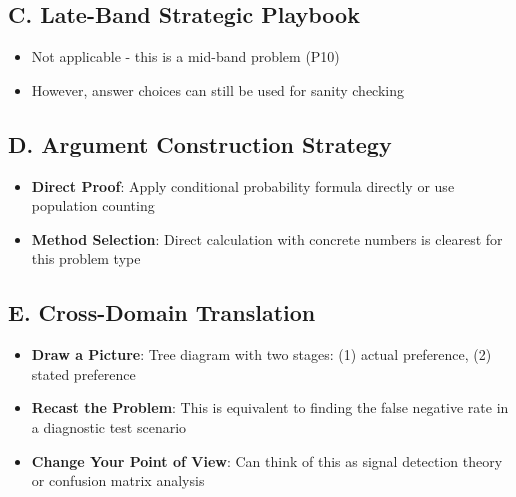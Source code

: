 \documentclass[]{article}
\begin{document}
\begin{strategicbox}
\subsection*{C. Late-Band Strategic Playbook}
\begin{itemize}[leftmargin=*]
    \item Not applicable - this is a mid-band problem (P10)
    \item However, answer choices can still be used for sanity checking
\end{itemize}

\subsection*{D. Argument Construction Strategy}
\begin{itemize}[leftmargin=*]
    \item \textbf{Direct Proof}: Apply conditional probability formula directly or use population counting
    
    \item \textbf{Method Selection}: Direct calculation with concrete numbers is clearest for this problem type
\end{itemize}

\subsection*{E. Cross-Domain Translation}
\begin{itemize}[leftmargin=*]
    \item \textbf{Draw a Picture}: Tree diagram with two stages: (1) actual preference, (2) stated preference
    
    \item \textbf{Recast the Problem}: This is equivalent to finding the false negative rate in a diagnostic test scenario
    
    \item \textbf{Change Your Point of View}: Can think of this as signal detection theory or confusion matrix analysis
\end{itemize}
\end{strategicbox}
\end{document}
